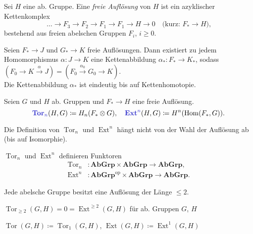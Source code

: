\documentclass{cheat-sheet}
\newcommand{\AbGrp}{\mathbf{AbGrp}} %
\DeclareMathOperator{\Hom}{Hom} %
\DeclareMathOperator{\Tor}{Tor}
\DeclareMathOperator{\Ext}{Ext}
\newcommand{\op}{\mathrm{op}} %
\newcommand{\inlineitem}[1]{\textbullet \enspace #1} %
\begin{document}
\begin{defn}
  Sei $H$ eine ab. Gruppe. Eine \emph{freie Auflösung} von $H$ ist ein azyklischer Kettenkomplex
  \[
    \ldots \to F_3 \to F_2 \to F_1 \to F_1 \to H \to 0
    \quad \text{(kurz: $F_* \to H$),}
  \]
  bestehend aus freien abelschen Gruppen $F_i$, $i \geq 0$.
\end{defn}

\begin{prop}
  Seien $F_* \to J$ und $G_* \to K$ freie Auflösungen. Dann existiert zu jedem Homomorphismus $\alpha : J \to K$ eine Kettenabbildung $\alpha_* : F_* \to K_*$, sodass
  $(F_0 \to K \xrightarrow{\alpha} J) = (F_0 \xrightarrow{\alpha_0} G_0 \to K)$.\\
  Die Kettenabbildung $\alpha_*$ ist eindeutig bis auf Kettenhomotopie.
\end{prop}

\begin{defn}
  Seien $G$ und $H$ ab. Gruppen und $F_* \to H$ eine freie Auflösung.
  \[
    \text{\emph{$\mathrm{\mathbf{Tor}}_n$}}(H, G) \coloneqq H_n(F_* \otimes G), \quad
    \text{\emph{$\mathrm{\mathbf{Ext}}^n$}}(H, G) \coloneqq H^n(\Hom(F_*, G)).
  \]
\end{defn}

\begin{prop}
  Die Definition von $\Tor_n$ und $\Ext^n$ hängt nicht von der Wahl der Auflösung ab (bis auf Isomorphie).
\end{prop}

\begin{prop}
  $\Tor_n$ und $\Ext^n$ definieren Funktoren
  \begin{align*}
    \Tor_n &: \AbGrp \times \AbGrp \to \AbGrp, \\
    \Ext^n &: \AbGrp^\op \times \AbGrp \to \AbGrp.
  \end{align*}
\end{prop}

\begin{prop}
  Jede abelsche Gruppe besitzt eine Auflösung der Länge $\leq 2$.
\end{prop}

\begin{kor}
  $\Tor_{\geq 2}(G, H) = 0 = \Ext^{\geq 2}(G, H)$ für ab. Gruppen $G$, $H$
\end{kor}

\begin{nota}
  \inlineitem{$\Tor(G, H) \coloneqq \Tor_1(G, H)$,} \enspace
  \inlineitem{$\Ext(G, H) \coloneqq \Ext^1(G, H)$}
\end{nota}
\end{document}
